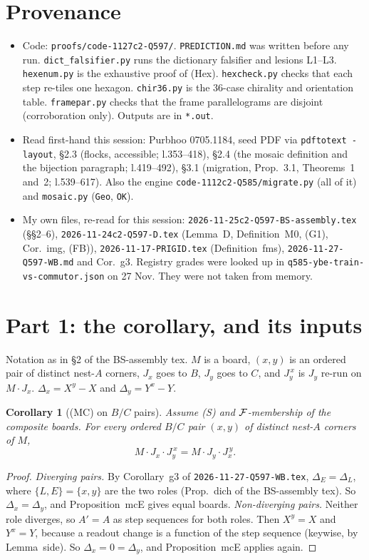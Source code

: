 \documentclass[11pt]{article}
\newtheorem{corollary}[theorem]{Corollary}
\theoremstyle{definition}\newtheorem{definition}[theorem]{Definition}\newtheorem{remark}[theorem]{Remark}
\begin{document}
\section*{Provenance}
\begin{itemize}
\item Code: \texttt{proofs/code-1127c2-Q597/}. \texttt{PREDICTION.md} was written before any run. \texttt{dict\_falsifier.py} runs the dictionary falsifier and lesions L1--L3. \texttt{hexenum.py} is the exhaustive proof of (Hex). \texttt{hexcheck.py} checks that each step re-tiles one hexagon. \texttt{chir36.py} is the 36-case chirality and orientation table. \texttt{framepar.py} checks that the frame parallelograms are disjoint (corroboration only). Outputs are in \texttt{*.out}.
\item Read first-hand this session: Purbhoo 0705.1184, seed PDF via \texttt{pdftotext -layout}, \S2.3 (flocks, accessible; l.353--418), \S2.4 (the mosaic definition and the bijection paragraph; l.419--492), \S3.1 (migration, Prop.~3.1, Theorems~1 and~2; l.539--617). Also the engine \texttt{code-1112c2-Q585/migrate.py} (all of it) and \texttt{mosaic.py} (\texttt{Geo}, \texttt{OK}).
\item My own files, re-read for this session: \texttt{2026-11-25c2-Q597-BS-assembly.tex} (\S\S2--6), \texttt{2026-11-24c2-Q597-D.tex} (Lemma~D, Definition~M0, (G1), Cor.~img, (FB)), \texttt{2026-11-17-PRIGID.tex} (Definition~fms), \texttt{2026-11-27-Q597-WB.md} and Cor.~g3. Registry grades were looked up in \texttt{q585-ybe-train-vs-commutor.json} on 27 Nov. They were not taken from memory.
\end{itemize}

\section{Part 1: the corollary, and its inputs}\label{sec:p1}
Notation as in \S2 of the BS-assembly tex. $M$ is a board, $(x,y)$ is an ordered pair of distinct nest-$A$ corners, $J_x$ goes to $B$, $J_y$ goes to $C$, and $J_y^{\,x}$ is $J_y$ re-run on $M\cdot J_x$. $\Delta_x=X^y-X$ and $\Delta_y=Y^x-Y$.

\begin{corollary}[(MC) on $B/C$ pairs]\label{cor:mc}
Assume (S) and $\mathcal F$-membership of the composite boards. For every ordered $B/C$ pair $(x,y)$ of distinct nest-$A$ corners of $M$,
\[M\cdot J_x\cdot J_y^{\,x}=M\cdot J_y\cdot J_x^{\,y}.\]
\end{corollary}
\begin{proof}
\emph{Diverging pairs.} By Corollary~g3 of \texttt{2026-11-27-Q597-WB.tex}, $\Delta_E=\Delta_L$, where $\{L,E\}=\{x,y\}$ are the two roles (Prop.~dich of the BS-assembly tex). So $\Delta_x=\Delta_y$, and Proposition~mcE gives equal boards.
\emph{Non-diverging pairs.} Neither role diverges, so $A'=A$ as step sequences for both roles. Then $X^y=X$ and $Y^x=Y$, because a readout change is a function of the step sequence (keywise, by Lemma~side). So $\Delta_x=0=\Delta_y$, and Proposition~mcE applies again.
\end{proof}
\end{document}
